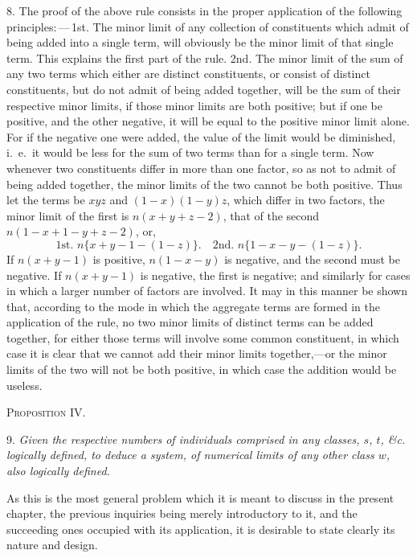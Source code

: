\documentclass[oneside]{book}
\begin{document}
8. The proof of the above rule consists in the proper application
of the following principles:\,---\,1st. The minor limit of any
collection of constituents which admit of being added into a single
term, will obviously be the minor limit of that single term.
This explains the first part of the rule. 2nd. The minor limit
of the sum of any two terms which either are distinct constituents,
or consist of distinct constituents, but do not admit of being
added together, will be the sum of their respective minor limits,
if those minor limits are both positive; but if one be positive, and
the other negative, it will be equal to the positive minor limit
alone. For if the negative one were added, the value of the limit
would be diminished, i.~e.\ it would be less for the sum of two
terms than for a single term. Now whenever two constituents
differ in more than one factor, so as not to admit of being added
together, the minor limits of the two cannot be both positive.
Thus let the terms be $xyz$ and $(1-x) (1-y) z$, which differ in
two factors, the minor limit of the first is $ n(x + y + z-2)$, that
of the second $n(1-x + 1-y + z-2)$, or,
\[
\text{1st. }n\{x + y-1-(1-z)\}.\quad  \text{2nd. }n\{1-x-y-(1-z)\}.
\]
If $n(x + y-1)$ is positive, $n(1-x-y)$ is negative, and the second must be negative. If $n(x + y-1)$ is negative, the first is
negative; and similarly for cases in which a larger number of
factors are involved. It may in this manner be shown that,
according to the mode in which the aggregate terms are formed in
the application of the rule, no two minor limits of distinct terms
can be added together, for either those terms will involve some
common constituent, in which case it is clear that we cannot add
their minor limits together,---or the minor limits of the two will
not be both positive, in which case the addition would be useless.


\textsc{Proposition IV.}

9. \textit{Given the respective numbers of individuals comprised in
any classes, $s$, $t$, \&c. logically defined, to deduce a system, of numerical
limits of any other class $w$, also logically defined.}

As this is the most general problem which it is meant to discuss
in the present chapter, the previous inquiries being merely
introductory to it, and the succeeding ones occupied with its application,
it is desirable to state clearly its nature and design.
\end{document}
